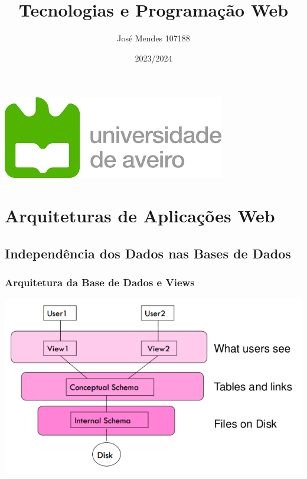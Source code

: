 \documentclass{article}
\title{Tecnologias e Programação Web}
\author{José Mendes 107188}
\date{2023/2024}
\begin{document}
\begin{titlepage}
    \maketitle
    \begin{center}
        \includegraphics[scale=0.4]{UA.png}
    \end{center}
    \thispagestyle{empty} %
\end{titlepage}

\pagebreak

\section{Arquiteturas de Aplicações Web}

\subsection{Independência dos Dados nas Bases de Dados}

\subsubsection{Arquitetura da Base de Dados e Views}

\begin{center}
    \includegraphics[scale=0.4]{1}
\end{center}
\end{document}
